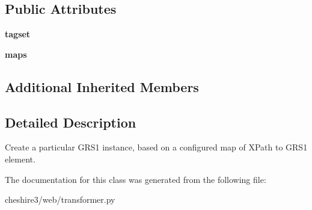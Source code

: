 \subsection*{Public Attributes}
\begin{DoxyCompactItemize}
\item 
\hypertarget{classcheshire3_1_1web_1_1transformer_1_1_grs_map_transformer_aa22698f42e07cd9d8f477be9b16941b6}{{\bfseries tagset}}\label{classcheshire3_1_1web_1_1transformer_1_1_grs_map_transformer_aa22698f42e07cd9d8f477be9b16941b6}

\item 
\hypertarget{classcheshire3_1_1web_1_1transformer_1_1_grs_map_transformer_ad33e2abea1b799b120b568b58d42ad3c}{{\bfseries maps}}\label{classcheshire3_1_1web_1_1transformer_1_1_grs_map_transformer_ad33e2abea1b799b120b568b58d42ad3c}

\end{DoxyCompactItemize}
\subsection*{Additional Inherited Members}


\subsection{Detailed Description}
\begin{DoxyVerb}Create a particular GRS1 instance, based on a configured map of XPath to GRS1 element. \end{DoxyVerb}
 

The documentation for this class was generated from the following file\-:\begin{DoxyCompactItemize}
\item 
cheshire3/web/transformer.\-py\end{DoxyCompactItemize}

